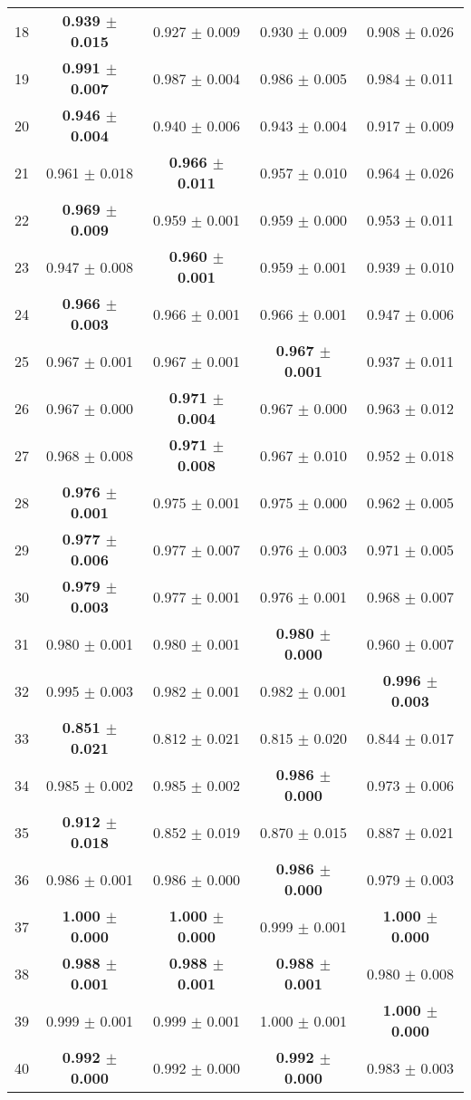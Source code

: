 \begin{table}[!ht]
{\begin{tabular}{r c c c c}
18 & \textbf{0.939 $\pm$ 0.015} & 0.927 $\pm$ 0.009 & 0.930 $\pm$ 0.009 & 0.908 $\pm$ 0.026 \\
19 & \textbf{0.991 $\pm$ 0.007} & 0.987 $\pm$ 0.004 & 0.986 $\pm$ 0.005 & 0.984 $\pm$ 0.011 \\
20 & \textbf{0.946 $\pm$ 0.004} & 0.940 $\pm$ 0.006 & 0.943 $\pm$ 0.004 & 0.917 $\pm$ 0.009 \\
21 & 0.961 $\pm$ 0.018 & \textbf{0.966 $\pm$ 0.011} & 0.957 $\pm$ 0.010 & 0.964 $\pm$ 0.026 \\
22 & \textbf{0.969 $\pm$ 0.009} & 0.959 $\pm$ 0.001 & 0.959 $\pm$ 0.000 & 0.953 $\pm$ 0.011 \\
23 & 0.947 $\pm$ 0.008 & \textbf{0.960 $\pm$ 0.001} & 0.959 $\pm$ 0.001 & 0.939 $\pm$ 0.010 \\
24 & \textbf{0.966 $\pm$ 0.003} & 0.966 $\pm$ 0.001 & 0.966 $\pm$ 0.001 & 0.947 $\pm$ 0.006 \\
25 & 0.967 $\pm$ 0.001 & 0.967 $\pm$ 0.001 & \textbf{0.967 $\pm$ 0.001} & 0.937 $\pm$ 0.011 \\
26 & 0.967 $\pm$ 0.000 & \textbf{0.971 $\pm$ 0.004} & 0.967 $\pm$ 0.000 & 0.963 $\pm$ 0.012 \\
27 & 0.968 $\pm$ 0.008 & \textbf{0.971 $\pm$ 0.008} & 0.967 $\pm$ 0.010 & 0.952 $\pm$ 0.018 \\
28 & \textbf{0.976 $\pm$ 0.001} & 0.975 $\pm$ 0.001 & 0.975 $\pm$ 0.000 & 0.962 $\pm$ 0.005 \\
29 & \textbf{0.977 $\pm$ 0.006} & 0.977 $\pm$ 0.007 & 0.976 $\pm$ 0.003 & 0.971 $\pm$ 0.005 \\
30 & \textbf{0.979 $\pm$ 0.003} & 0.977 $\pm$ 0.001 & 0.976 $\pm$ 0.001 & 0.968 $\pm$ 0.007 \\
31 & 0.980 $\pm$ 0.001 & 0.980 $\pm$ 0.001 & \textbf{0.980 $\pm$ 0.000} & 0.960 $\pm$ 0.007 \\
32 & 0.995 $\pm$ 0.003 & 0.982 $\pm$ 0.001 & 0.982 $\pm$ 0.001 & \textbf{0.996 $\pm$ 0.003} \\
33 & \textbf{0.851 $\pm$ 0.021} & 0.812 $\pm$ 0.021 & 0.815 $\pm$ 0.020 & 0.844 $\pm$ 0.017 \\
34 & 0.985 $\pm$ 0.002 & 0.985 $\pm$ 0.002 & \textbf{0.986 $\pm$ 0.000} & 0.973 $\pm$ 0.006 \\
35 & \textbf{0.912 $\pm$ 0.018} & 0.852 $\pm$ 0.019 & 0.870 $\pm$ 0.015 & 0.887 $\pm$ 0.021 \\
36 & 0.986 $\pm$ 0.001 & 0.986 $\pm$ 0.000 & \textbf{0.986 $\pm$ 0.000} & 0.979 $\pm$ 0.003 \\
37 & \textbf{1.000 $\pm$ 0.000} & \textbf{1.000 $\pm$ 0.000} & 0.999 $\pm$ 0.001 & \textbf{1.000 $\pm$ 0.000} \\
38 & \textbf{0.988 $\pm$ 0.001} & \textbf{0.988 $\pm$ 0.001} & \textbf{0.988 $\pm$ 0.001} & 0.980 $\pm$ 0.008 \\
39 & 0.999 $\pm$ 0.001 & 0.999 $\pm$ 0.001 & 1.000 $\pm$ 0.001 & \textbf{1.000 $\pm$ 0.000} \\
40 & \textbf{0.992 $\pm$ 0.000} & 0.992 $\pm$ 0.000 & \textbf{0.992 $\pm$ 0.000} & 0.983 $\pm$ 0.003 \\
\end{tabular}}
\end{table}
